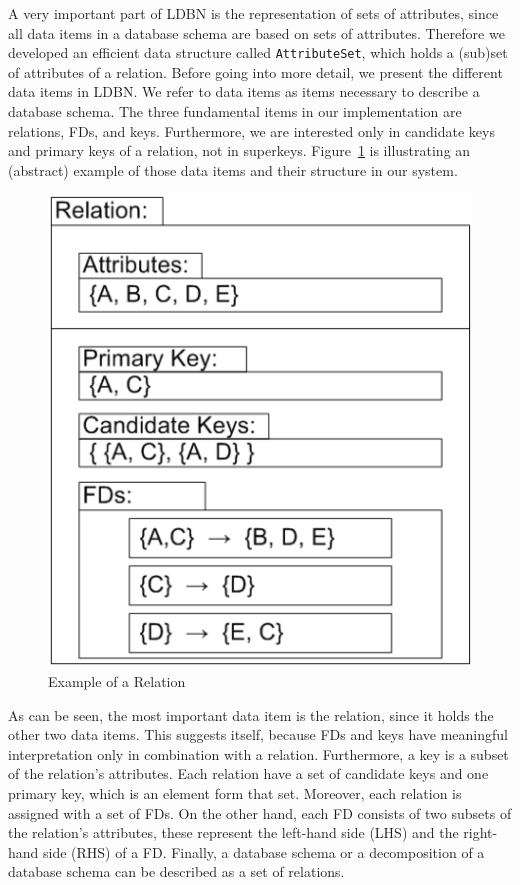 A very important part of LDBN is the representation of sets of attributes, since all 
data items in a database schema are based on sets of attributes. Therefore we developed an
efficient data structure called \verb=AttributeSet=, which holds a (sub)set of attributes of a relation.  
Before going into more detail, we present the different data items in LDBN. 
We refer to data items as items necessary to describe a database schema.  
The three fundamental items in our implementation are relations, FDs, and keys. Furthermore,
we are interested only in candidate keys and primary keys of a relation, not in superkeys.
Figure~\ref{fig:relexample} is illustrating
an (abstract) example of those data items and their structure in our system. 

\begin{figure}[h]
  \begin{center}
    \includegraphics[scale=0.4]{./img/relation-example01a.png}
    \caption{Example of a Relation}
    \label{fig:relexample}
  \end{center}
\end{figure}

As can be seen, the most important data item is the relation, since
it holds the other two data items. This suggests itself, because FDs and keys have meaningful
interpretation only in combination with a relation. Furthermore, a key is a subset of 
the relation's attributes.
Each relation have a set of candidate keys and one primary key, which is an element form that set. 
Moreover, each relation is assigned with a set of FDs. On the other hand, 
each FD consists of two subsets of
the relation's attributes, these represent the left-hand side (LHS) and the 
right-hand side (RHS) of a FD. Finally, a database schema or a decomposition of
a database schema can be described as a set of relations.


